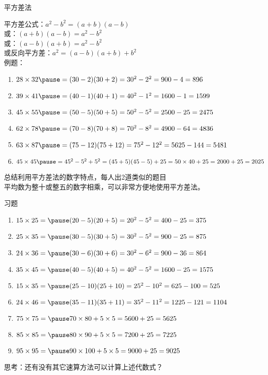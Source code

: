 \documentclass[aspectratio=169]{ctexbeamer} %
\date{\today}
\begin{document}
\begin{frame}[t]{平方差法}
\begin{spacing}{1.2}
\normalsize
平方差公式：$a^2 - b^2 = (a+b)(a-b)$ \\
或：$(a+b)(a-b)=a^2 - b^2$ \\
或：$(a-b)(a+b)=a^2 - b^2$ \\
或反向平方差：$a^2 = (a-b)(a+b) + b^2$ \\
例题：
\begin{enumerate}[label={\arabic*.}]
\item $28 \times 32 \pause = (30-2)(30+2)=30^2-2^2=900-4=896$
\item $39 \times 41 \pause = (40-1)(40+1)=40^2-1^2=1600-1=1599$
\item $45 \times 55 \pause = (50-5)(50+5)=50^2-5^2=2500-25=2475$
\item $62 \times 78 \pause = (70-8)(70+8)=70^2-8^2=4900-64=4836$
\item $63 \times 87 \pause = (75-12)(75+12)=75^2-12^2=5625-144=5481$
\item $45 \times 45 \pause = 45^2 - 5^2 + 5^2 = (45+5)(45-5) + 25 =50 \times 40 + 25=2000 + 25 = 2025$
\end{enumerate}
\alert{总结利用平方差法的数字特点，每人出2道类似的题目} \\
\pause
平均数为整十或整五的数字相乘，可以非常方便地使用平方差法。
\end{spacing}
\end{frame}

\begin{frame}[t]{习题}
\begin{spacing}{1.2}
\normalsize
\begin{enumerate}[label={\arabic*.}]
\item $15 \times 25 = \pause (20-5)(20+5) = 20^2-5^2 = 400-25 = 375$
\item $25 \times 35 = \pause (30-5)(30+5) = 30^2-5^2 = 900-25 = 875$
\item $24 \times 36 = \pause (30-6)(30+6) = 30^2-6^2 = 900-36 = 864$
\item $35 \times 45 = \pause (40-5)(40+5) = 40^2-5^2 = 1600-25 = 1575$
\item $15 \times 35 = \pause (25-10)(25+10) = 25^2-10^2 = 625-100 = 525$
\item $24 \times 46 = \pause (35-11)(35+11) = 35^2-11^2 = 1225-121 = 1104$
\item $75 \times 75 = \pause 70 \times 80 + 5 \times 5 = 5600 + 25 = 5625$
\item $85 \times 85 = \pause 80 \times 90 + 5 \times 5 = 7200 + 25 = 7225$
\item $95 \times 95 = \pause 90 \times 100 + 5 \times 5 = 9000 + 25 = 9025$
\end{enumerate}
\alert{思考：还有没有其它速算方法可以计算上述代数式？}
\end{spacing}
\end{frame}
\end{document}
